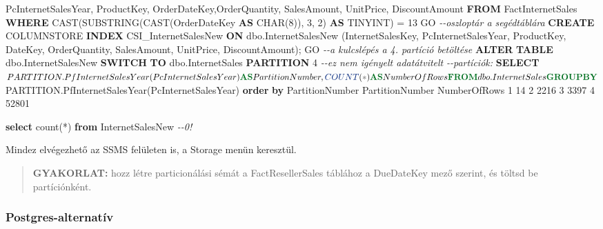 \documentclass[
  magyar,
]{article}
\newenvironment{Shaded}{}{}
\newcommand{\CommentTok}[1]{\textcolor[rgb]{0.38,0.63,0.69}{\textit{#1}}}
\newcommand{\DataTypeTok}[1]{\textcolor[rgb]{0.56,0.13,0.00}{#1}}
\newcommand{\DecValTok}[1]{\textcolor[rgb]{0.25,0.63,0.44}{#1}}
\newcommand{\FunctionTok}[1]{\textcolor[rgb]{0.02,0.16,0.49}{#1}}
\newcommand{\KeywordTok}[1]{\textcolor[rgb]{0.00,0.44,0.13}{\textbf{#1}}}
\newcommand{\NormalTok}[1]{#1}
\newcommand{\OperatorTok}[1]{\textcolor[rgb]{0.40,0.40,0.40}{#1}}
\begin{document}
\begin{Shaded}
\begin{Highlighting}[]
\NormalTok{PcInternetSalesYear,}
\NormalTok{   ProductKey, OrderDateKey,OrderQuantity, SalesAmount, UnitPrice, DiscountAmount}
\KeywordTok{FROM}\NormalTok{ FactInternetSales}
\KeywordTok{WHERE} \FunctionTok{CAST}\NormalTok{(SUBSTRING(}\FunctionTok{CAST}\NormalTok{(OrderDateKey }\KeywordTok{AS} \DataTypeTok{CHAR}\NormalTok{(}\DecValTok{8}\NormalTok{)), }\DecValTok{3}\NormalTok{, }\DecValTok{2}\NormalTok{) }\KeywordTok{AS}\NormalTok{ TINYINT) }\OperatorTok{=} \DecValTok{13}
\NormalTok{GO}
\CommentTok{{-}{-}oszloptár a segédtáblára}
\KeywordTok{CREATE}\NormalTok{ COLUMNSTORE }\KeywordTok{INDEX}\NormalTok{ CSI\_InternetSalesNew}
\KeywordTok{ON}\NormalTok{ dbo.InternetSalesNew (InternetSalesKey, PcInternetSalesYear, ProductKey, DateKey,}
\NormalTok{OrderQuantity, SalesAmount, UnitPrice, DiscountAmount);}
\NormalTok{GO}
\CommentTok{{-}{-}a kulcslépés a 4. partíció betöltése}
\KeywordTok{ALTER} \KeywordTok{TABLE}\NormalTok{ dbo.InternetSalesNew }\KeywordTok{SWITCH} \KeywordTok{TO}\NormalTok{ dbo.InternetSales }\KeywordTok{PARTITION} \DecValTok{4}
\CommentTok{{-}{-}ez nem igényelt adatátvitelt}
\CommentTok{{-}{-}partíciók:}
\KeywordTok{SELECT}\NormalTok{ $PARTITION.PfInternetSalesYear(PcInternetSalesYear) }\KeywordTok{AS}\NormalTok{ PartitionNumber,}
\FunctionTok{COUNT}\NormalTok{(}\OperatorTok{*}\NormalTok{) }\KeywordTok{AS}\NormalTok{ NumberOfRows}
\KeywordTok{FROM}\NormalTok{ dbo.InternetSales }\KeywordTok{GROUP} \KeywordTok{BY}\NormalTok{ $PARTITION.PfInternetSalesYear(PcInternetSalesYear)}
\KeywordTok{order} \KeywordTok{by}\NormalTok{ PartitionNumber}
\NormalTok{PartitionNumber     NumberOfRows}
\DecValTok{1}                   \DecValTok{14}
\DecValTok{2}                   \DecValTok{2216}
\DecValTok{3}                   \DecValTok{3397}
\DecValTok{4}                   \DecValTok{52801}

\KeywordTok{select} \FunctionTok{count}\NormalTok{(}\OperatorTok{*}\NormalTok{) }\KeywordTok{from}\NormalTok{ InternetSalesNew }\CommentTok{{-}{-}0!}
\end{Highlighting}
\end{Shaded}

Mindez elvégezhető az SSMS felületen is, a Storage menün keresztül.

\begin{quote}
\textbf{GYAKORLAT:} hozz létre particionálási sémát a FactResellerSales
táblához a DueDateKey mező szerint, és töltsd be partíciónként.
\end{quote}

\subsubsection{Postgres-alternatív}\label{postgres-alternatuxedv}
\end{document}
